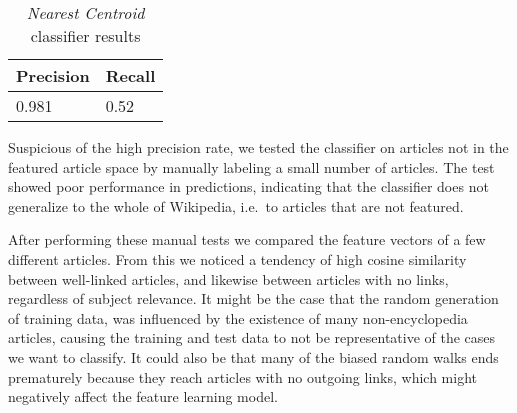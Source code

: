 \begin{table}[htbp]
\centering
\begin{tabular}{@{}ll@{}}
\toprule
Precision     & Recall       \\ \midrule
\num{0.981} & \num{0.52} \\
\bottomrule
\end{tabular}
\caption[Nearest Centroid classifier results]{\emph{Nearest Centroid} classifier results}%
\label{eval-results}
\end{table}

Suspicious of the high precision rate, we tested the classifier on articles not in the featured article space by manually labeling a small number of articles. The test showed poor performance in predictions, indicating that the classifier does not generalize to the whole of Wikipedia, i.e.\ to articles that are not featured.

After performing these manual tests we compared the feature vectors of a few different articles. From this we noticed a tendency of high cosine similarity between well-linked articles, and likewise between articles with no links, regardless of subject relevance. It might be the case that the random generation of training data, was influenced by the existence of many non-encyclopedia articles, causing the training and test data to not be representative of the cases we want to classify. It could also be that many of the biased random walks ends prematurely because they reach articles with no outgoing links, which might negatively affect the feature learning model.



